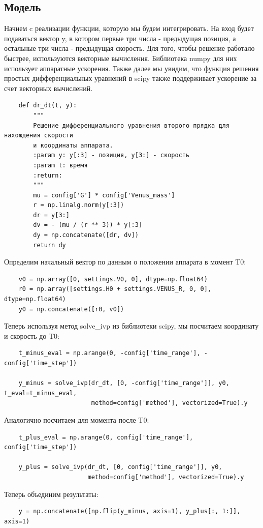 \documentclass{article}
\begin{document}
    \subsection{Модель}
    Начнем c реализации функции, которую мы будем интегрировать. На вход будет подаваться вектор y, в котором первые три числа - предыдущая позиция, а остальные три числа - предыдущая скорость. Для того, чтобы решение работало быстрее, используются векторные вычисления. Библиотека numpy для них использует аппаратные ускорения. Также далее мы увидим, что функция решения простых дифференциальных уравнений в scipy также поддерживает ускорение за счет векторных вычислений.
    \begin{verbatim}
    def dr_dt(t, y):
        """
        Решение дифференциального уравнения второго прядка для нахождения скорости 
        и координаты аппарата.
        :param y: y[:3] - позиция, y[3:] - скорость
        :param t: время
        :return: 
        """
        mu = config['G'] * config['Venus_mass']
        r = np.linalg.norm(y[:3])
        dr = y[3:]
        dv = - (mu / (r ** 3)) * y[:3]
        dy = np.concatenate([dr, dv])
        return dy
    \end{verbatim}
    Определим начальный вектор по данным о положении аппарата в момент T0:
    \begin{verbatim}
    v0 = np.array([0, settings.V0, 0], dtype=np.float64)
    r0 = np.array([settings.H0 + settings.VENUS_R, 0, 0], dtype=np.float64)
    y0 = np.concatenate([r0, v0])
    \end{verbatim}
    Теперь используя метод solve\_ivp из библиотеки scipy, мы посчитаем координату и скорость до T0: 
    \begin{verbatim}
    t_minus_eval = np.arange(0, -config['time_range'], -config['time_step'])

    y_minus = solve_ivp(dr_dt, [0, -config['time_range']], y0, t_eval=t_minus_eval, 
                        method=config['method'], vectorized=True).y
    \end{verbatim}
    Аналогично посчитаем для момента после T0:
    \begin{verbatim}
    t_plus_eval = np.arange(0, config['time_range'], config['time_step'])

    y_plus = solve_ivp(dr_dt, [0, config['time_range']], y0,
                       method=config['method'], vectorized=True).y
    \end{verbatim}
    Теперь объединим результаты:
    \begin{verbatim}
    y = np.concatenate([np.flip(y_minus, axis=1), y_plus[:, 1:]], axis=1)
    \end{verbatim}
\end{document}
